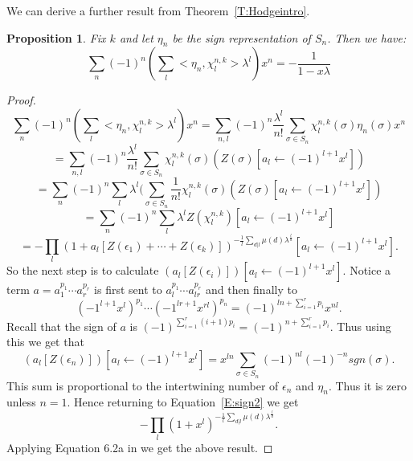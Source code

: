 \documentclass{amsart}
\newtheorem{proposition}[theorem]{Proposition}
\begin{document}
We can derive a further result from Theorem~\ref{T:Hodgeintro}. 

\begin{proposition} \label{P:sign1} Fix $k$ and let $\eta_n$ be the sign representation of $S_n$. Then we have:
  \begin{equation}
    \sum_n (-1)^n(\sum_l <\eta_n, \chi_l^{n, k}> \lambda^l)x^n = -\frac{1}{1-x\lambda}
  \end{equation}
\end{proposition}
\begin{proof}
$$  \sum_n (-1)^n(\sum_l <\eta_n, \chi_l^{n, k}> \lambda^l) x^n = \sum_{n, l} (-1)^n \frac{\lambda^l}{n!} \sum_{\sigma \in S_n}
    \chi_l^{n, k}(\sigma) \eta_n(\sigma) x^n$$
$$ =\sum_{n, l} (-1)^n \frac{\lambda^l}{n!} \sum_{\sigma \in S_n} \chi_l^{n, k}(\sigma) (Z(\sigma)[a_l \leftarrow (-1)^{l+1}x^l])$$
$$ =\sum_n (-1)^n \sum_l \lambda^l (\sum_{\sigma \in S_n} \frac{1}{n!} \chi_l^{n, k}(\sigma) (Z(\sigma)[a_l \leftarrow (-1)^{l+1}x^l])$$
$$ =\sum_n (-1)^n \sum_l \lambda^l Z(\chi_l^{n, k})[a_l \leftarrow (-1)^{l+1}x^l]$$
\begin{equation} \label{E:sign2} =-\prod_l (1+a_l[Z(\epsilon_1) + \cdots + Z(\epsilon_k)])^{-\frac{1}{l} \sum_{d|l} \mu(d) \lambda^{\frac{l}{d}}}[a_l \leftarrow (-1)^{l+1}x^l].
\end{equation}
So the next step is to calculate $(a_l[Z(\epsilon_i)])[a_l \leftarrow (-1)^{l+1}x^l]$. Notice a term $a=a_1^{p_1} \cdots 
a_r^{p_r}$ is first sent to $a_l^{p_1} \cdots a_{lr}^{p_r}$ and then finally to
\begin{equation} \label{E:sign1}
  (-1^{l+1}x^l)^{p_1} \cdots (-1^{lr+1}x^{rl})^{p_n} =(-1)^{ln + \sum_{i=1}^r p_i}x^{nl}.
\end{equation} Recall that the sign of $a$ is $(-1)^{\sum_{i=1}^r (i+1)p_i} = (-1)^{n+\sum_{i=1}^r p_i}.$ Thus using this we get that
$$(a_l[Z(\epsilon_n)])[a_l \leftarrow (-1)^{l+1}x^l] =  x^{ln} \sum_{\sigma \in S_n} (-1)^{nl}(-1)^{-n} sgn(\sigma).$$ This
sum is proportional to the intertwining number of $\epsilon_n$ and $\eta_n$. Thus it is zero unless $n=1$. Hence returning
to Equation~\ref{E:sign2} we get
$$-\prod_l (1+ x^l)^{-\frac{1}{l} \sum_{d|l} \mu(d) \lambda^{\frac{l}{d}}}.$$ Applying 
Equation 6.2a in \cite{Hanlon} we get the above result. 
\end{proof}
\end{document}
